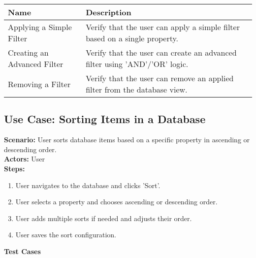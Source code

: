 \documentclass{article}
\begin{document}
            \begin{longtable}{|p{}|p{}|}
            \hline
            \textbf{Name} & \textbf{Description} \\
            \hline
            Applying a Simple Filter & Verify that the user can apply a simple filter based on a single property. \\
\hline
Creating an Advanced Filter & Verify that the user can create an advanced filter using 'AND'/'OR' logic. \\
\hline
Removing a Filter & Verify that the user can remove an applied filter from the database view. \\
\hline
\end{longtable}\subsection{\textbf{Use Case: Sorting Items in a Database}}
\textbf{Scenario:} User sorts database items based on a specific property in ascending or descending order.\\
\textbf{Actors:} User\\
\textbf{Steps:}
\begin{enumerate}
\item User navigates to the database and clicks 'Sort'.
\item User selects a property and chooses ascending or descending order.
\item User adds multiple sorts if needed and adjusts their order.
\item User saves the sort configuration.
\end{enumerate}
\textbf{Test Cases}
\end{document}
